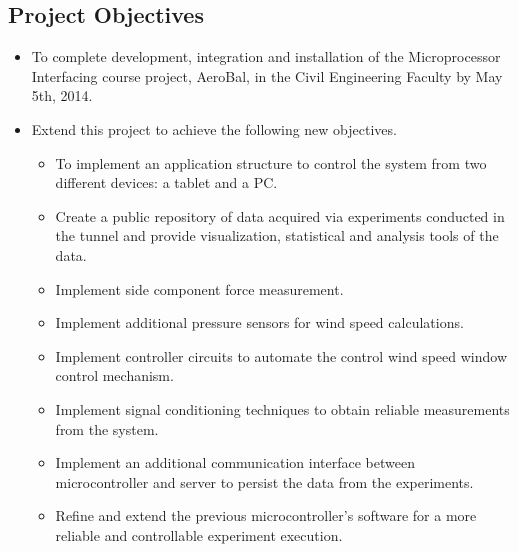 \subsection{Project Objectives}

\begin{itemize}
	\item To complete development, integration and installation of the Microprocessor Interfacing course project, AeroBal, in the Civil Engineering Faculty by May 5th, 2014.
	\item Extend this project to achieve the following new objectives.
	\begin{itemize}
		\item To implement an application structure to control the system from two different devices: a tablet and a PC.
		\item Create a public repository of data acquired via experiments conducted in the tunnel and provide visualization, statistical and analysis tools of the data.
		\item Implement side component force measurement.
		\item Implement additional pressure sensors for wind speed calculations.
		\item Implement controller circuits to automate the control wind speed window control mechanism.
		\item Implement signal conditioning techniques to obtain reliable measurements from the system.
		\item Implement an additional communication interface between microcontroller and server to persist the data from the experiments. 
		\item Refine and extend the previous microcontroller’s software for a more reliable and controllable experiment execution.
	\end{itemize}


\end{itemize}